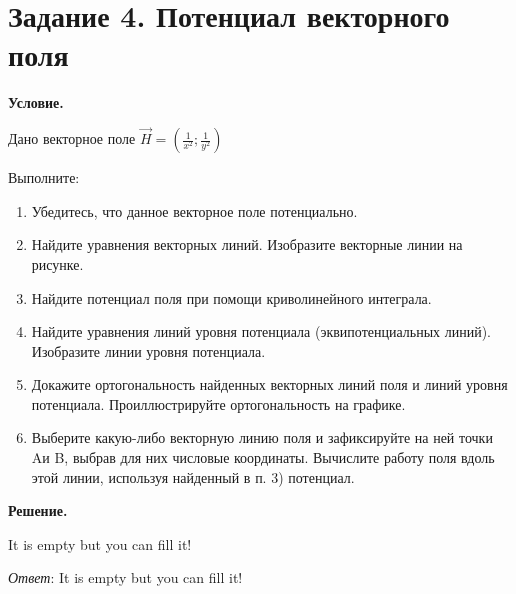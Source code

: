 \section{Задание 4. Потенциал векторного поля}

\textbf{Условие.}

Дано векторное поле $\overrightarrow{H} = \left(\frac{1}{x^2}; \frac{1}{y^2}\right)$

Выполните:
\begin{enumerate}
    \item Убедитесь, что данное векторное поле потенциально.

    \item Найдите уравнения векторных линий. Изобразите векторные линии на рисунке.

    \item Найдите потенциал поля при помощи криволинейного интеграла.

    \item Найдите уравнения линий уровня потенциала (эквипотенциальных линий). Изобразите линии уровня потенциала.

    \item Докажите ортогональность найденных векторных линий поля и линий уровня потенциала. Проиллюстрируйте ортогональность на графике.

    \item Выберите какую-либо векторную линию поля и зафиксируйте на ней точки Aи B, выбрав для них числовые координаты. Вычислите работу поля вдоль этой линии, используя найденный в п. 3) потенциал.


\end{enumerate}

\vspace{10mm}
\textbf{Решение.}

It is empty but you can fill it!

\textit{Ответ}:  It is empty but you can fill it!
\clearpage
